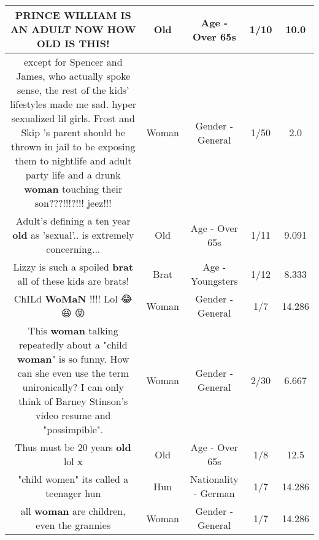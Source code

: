 \documentclass[11pt]{article}
\newlength\mylength
\begin{document}
\begin{center}
\begin{longtable}{|C{.65\mylength}|C{.30\mylength}|C{.12\mylength}|C{.12\mylength}|C{.12\mylength}|}
  \small PRINCE WILLIAM IS AN ADULT NOW HOW \textbf{OLD} IS THIS!\normalsize   & Old & Age - Over 65s & 1/10 & 10.0 \\  \hline
  \small except for Spencer and James, who actually spoke sense, the rest of the kids' lifestyles made me sad. hyper sexualized lil girls. Frost and Skip 's parent should be thrown in jail to be exposing them to nightlife and adult party life and a drunk \textbf{woman} touching their son???!!!?!!! jeez!!!\normalsize   & Woman & Gender - General & 1/50 & 2.0 \\  \hline
  \small Adult's defining a ten year \textbf{old} as  'sexual'.. is extremely concerning...\normalsize   & Old & Age - Over 65s & 1/11 & 9.091 \\  \hline
  \small Lizzy is such a spoiled \textbf{brat} all of these kids are brats!\normalsize   & Brat & Age - Youngsters & 1/12 & 8.333 \\  \hline
  \small ChILd \textbf{WoMaN} !!!! Lol 😂 😆 😝\normalsize   & Woman & Gender - General & 1/7 & 14.286 \\  \hline
  \small This \textbf{woman} talking repeatedly about a "child \textbf{woman}" is so funny. How can she even use the term unironically? I can only think of Barney Stinson's video resume and "possimpible".\normalsize   & Woman & Gender - General & 2/30 & 6.667 \\  \hline
  \small Thus must be 20 years \textbf{old} lol x\normalsize   & Old & Age - Over 65s & 1/8 & 12.5 \\  \hline
  \small "child women" its called a teenager hun\normalsize   & Hun & Nationality - German & 1/7 & 14.286 \\  \hline
  \small all \textbf{woman} are children, even the grannies\normalsize   & Woman & Gender - General & 1/7 & 14.286 \\  \hline

\end{longtable}
\end{center}
\end{document}
